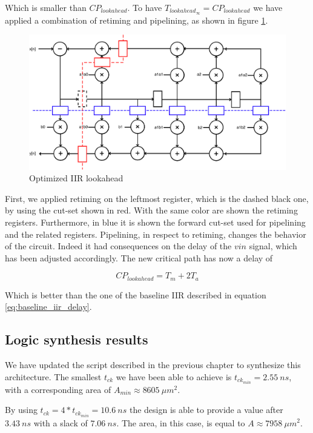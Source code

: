 Which is smaller than $CP_{lookahead}$. To have $T_{lookahead_{\infty}} = CP_{lookahead}$ we have applied a combination of retiming and pipelining, as
shown in figure \ref{fig:lookahead_opt}.

\begin{figure}[!ht]
	\centering
	\includegraphics[width=0.8\linewidth]{./chapters/pictures/iir_opt.pdf}
	\caption{Optimized IIR lookahead}
	\label{fig:lookahead_opt}
\end{figure}

First, we applied retiming on the leftmost register, which is the dashed black one, by using the cut-set shown in red. With the same color are shown the
retiming registers. Furthermore, in blue it is shown the forward cut-set used for pipelining and the related registers.
Pipelining, in respect to retiming, changes the behavior of the circuit. Indeed it had consequences on the delay of the $vin$ signal, which has been
adjusted accordingly. The new critical path has now a delay of

\begin{equation}
    \label{eq:lookahead_opt_delay}
    CP_{lookahead} = T_{m} + 2T_{a}
\end{equation}

Which is better than the one of the baseline IIR described in equation \ref{eq:baseline_iir_delay}.

\subsection{Logic synthesis results}

We have updated the script described in the previous chapter to synthesize this architecture.
The smallest $t_{ck}$ we have been able to achieve is $t_{ck_{min}} = 2.55\ ns$, with a corresponding
area of $A_{min} \approx 8605\ \mu m^2$.

By using $t_{ck} = 4*t_{ck_{min}} = 10.6\ ns$ the design is able to provide a value after $3.43\ ns$ with a slack of $7.06\ ns$.
The area, in this case, is equal to $A \approx 7958\ \mu m^2$.

